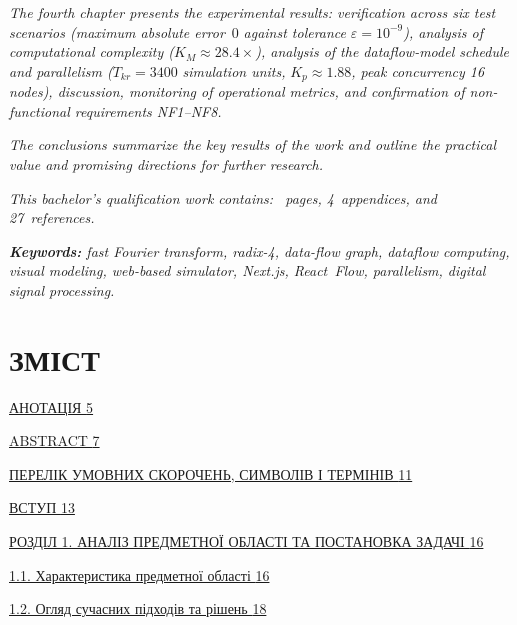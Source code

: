 \documentclass[
]{article}
\begin{document}
\emph{The fourth chapter presents the experimental results: verification
across six test scenarios (maximum absolute error}~\(0\)
\emph{against tolerance} \(\varepsilon = 10^{- 9}\)\emph{), analysis of
computational complexity (}\(K_{M} \approx 28.4 \times\)\emph{),
analysis of the dataflow-model schedule and parallelism
(}\(T_{kr} = 3400\) \emph{simulation units,}
\(K_{p} \approx 1.88\)\emph{, peak concurrency 16 nodes), discussion,
monitoring of operational metrics, and confirmation of non-functional
requirements NF1--NF8.}

\emph{The conclusions summarize the key results of the work and outline
the practical value and promising directions for further research.}

\emph{This bachelor's qualification work contains: ~pages,
4~appendices, and 27~references.}

\emph{\textbf{Keywords:} fast Fourier transform, radix-4, data-flow
graph, dataflow computing, visual modeling, web-based simulator,
Next.js, React~Flow, parallelism, digital signal processing.}

\emph{\hfill\break
}

\section{\texorpdfstring{\textbf{ЗМІСТ}}{ЗМІСТ}}\label{ux437ux43cux456ux441ux442}

\hyperref[_Toc230379703]{АНОТАЦІЯ \hyperref[_Toc230379703]{5}}

\hyperref[_Toc230379704]{ABSTRACT \hyperref[_Toc230379704]{7}}

\hyperref[_Toc230379705]{ПЕРЕЛІК УМОВНИХ СКОРОЧЕНЬ, СИМВОЛІВ І ТЕРМІНІВ
\hyperref[_Toc230379705]{11}}

\hyperref[_Toc230379706]{ВСТУП \hyperref[_Toc230379706]{13}}

\hyperref[_Toc230379707]{РОЗДІЛ 1. АНАЛІЗ ПРЕДМЕТНОЇ ОБЛАСТІ ТА
ПОСТАНОВКА ЗАДАЧІ \hyperref[_Toc230379707]{16}}

\hyperref[ux445ux430ux440ux430ux43aux442ux435ux440ux438ux441ux442ux438ux43aux430-ux43fux440ux435ux434ux43cux435ux442ux43dux43eux457-ux43eux431ux43bux430ux441ux442ux456]{1.1.
Характеристика предметної області
\hyperref[ux445ux430ux440ux430ux43aux442ux435ux440ux438ux441ux442ux438ux43aux430-ux43fux440ux435ux434ux43cux435ux442ux43dux43eux457-ux43eux431ux43bux430ux441ux442ux456]{16}}

\hyperref[ux43eux433ux43bux44fux434-ux441ux443ux447ux430ux441ux43dux438ux445-ux43fux456ux434ux445ux43eux434ux456ux432-ux442ux430-ux440ux456ux448ux435ux43dux44c]{1.2.
Огляд сучасних підходів та рішень
\hyperref[ux43eux433ux43bux44fux434-ux441ux443ux447ux430ux441ux43dux438ux445-ux43fux456ux434ux445ux43eux434ux456ux432-ux442ux430-ux440ux456ux448ux435ux43dux44c]{18}}
\end{document}
